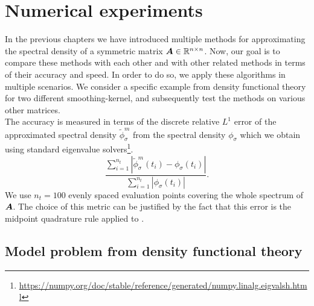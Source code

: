 \chapter{Numerical experiments}
\label{chp:5-experiments}

In the previous chapters we have introduced multiple methods for approximating the
spectral density of a symmetric matrix $\boldsymbol{A} \in \mathbb{R}^{n \times n}$. Now,
our goal is to compare these methods with each other and with other related methods
in terms of their accuracy and speed. In order to do so, we apply these algorithms
in multiple scenarios. We consider a specific example from density functional theory
\cite{lin2017randomized} for two different \gls{smoothing-kernel}, and
subsequently test the methods on various other matrices.\\

The accuracy is measured in terms of the discrete relative $L^1$ error of the approximated
spectral density $\tilde{\phi}_{\sigma}^m$ from the spectral density $\phi_{\sigma}$
which we obtain using standard eigenvalue solvers\footnote{\url{https://numpy.org/doc/stable/reference/generated/numpy.linalg.eigvalsh.html}}.
\begin{equation}
    \frac{\sum_{i=1}^{n_t} |\widetilde{\phi}_{\sigma}^m(t_i) - \phi_{\sigma}(t_i)|}{\sum_{i=1}^{n_t} |\phi_{\sigma}(t_i)|}.
    \label{equ:5-experiments-L1-error}
\end{equation}
We use $n_t=100$ evenly spaced evaluation points covering the whole spectrum of
$\boldsymbol{A}$. The choice of this metric can be justified by the fact that this
error is the midpoint quadrature rule applied to  \cite[chapter~9.2.1]{quarteroni2007numerical}. 


\section{Model problem from density functional theory}
\label{sec:5-experiments-density-function}

